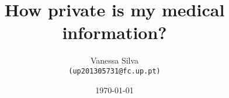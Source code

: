 \documentclass{article}
\begin{document}
%
%

\title{How private is my medical information?}
%
\author{Vanessa Silva\\
	{\texttt{(up201305731@fc.up.pt)}}\\
}

\date{\today}

\maketitle



\begin{abstract}


\end{abstract}


\end{document}
